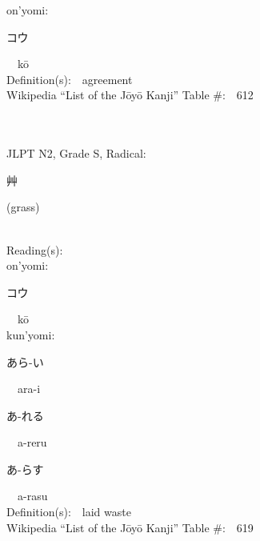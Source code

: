 \begin{multicols}{2}
{\hspace*{1em}}on'yomi:\ \ \\
{\hspace*{2em}}{\begin{CJK}{UTF8}{min} コウ \end{CJK}}\ \ k\=o\ \ \\
Definition(s):\ \ agreement \\
Wikipedia ``List of the J\=oy\=o Kanji'' Table \#:\ \ 612 \\
\ \ \\
{\fontsize{34pt}{40pt}  }\ \ \\  %
{JLPT N2, Grade S, Radical:\ \ {\begin{CJK}{UTF8}{min} 艸 \end{CJK}} (grass) } \\
Reading(s):\ \ \\
{\hspace*{1em}}on'yomi:\ \ \\
{\hspace*{2em}}{\begin{CJK}{UTF8}{min} コウ \end{CJK}}\ \ k\=o\ \ \\
{\hspace*{1em}}kun'yomi:\ \ \\
{\hspace*{2em}}{\begin{CJK}{UTF8}{min} あら-い \end{CJK}}\ \ ara-i\ \ \\
{\hspace*{2em}}{\begin{CJK}{UTF8}{min} あ-れる \end{CJK}}\ \ a-reru\ \ \\
{\hspace*{2em}}{\begin{CJK}{UTF8}{min} あ-らす \end{CJK}}\ \ a-rasu\ \ \\
Definition(s):\ \ laid waste \\
Wikipedia ``List of the J\=oy\=o Kanji'' Table \#:\ \ 619 \\
\ \ \\
{\fontsize{34pt}{40pt}  }\ \ \\  %

\end{multicols}
